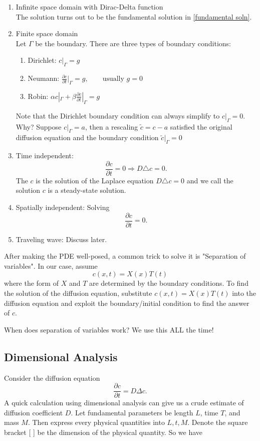 \documentclass[]{article}
\numberwithin{equation}{section}		%
\def\beq{\begin{equation}}
\def\eeq{\end{equation}}
\begin{document}
\begin{enumerate}
\item{Infinite space domain with Dirac-Delta function} \\
The solution turns out to be the fundamental solution in \eqref{fundamental soln}.

\item{Finite space domain } \\
Let $\Gamma$ be the boundary. There are three types of boundary conditions:
	\begin{enumerate}
		\item{Dirichlet:} $c|_{\Gamma}=g$
		\item{Neumann:} $\frac{\partial c}{\partial t}|_{\Gamma}=g,\qquad \text{usually }g=0$
		\item{Robin:} $\alpha c|_{\Gamma}+\beta\frac{\partial c}{\partial t}|_{\Gamma}=g$
	\end{enumerate}
	Note that the Dirichlet boundary condition can always simplify to $c|_{\Gamma}=0$. Why? Suppose $c|_{\Gamma}=a$, then a rescaling $\tilde c=c-a$ satisfied the original diffusion equation and the boundary condition $\tilde c|_{\Gamma}=0$
	
\item{Time independent:}
\beq
	\frac{\partial c}{\partial t}=0\Rightarrow D\triangle c=0.
\eeq
The $c$ is the solution of the Laplace equation $D\triangle c=0$ and we call the solution $c$ is a steady-state solution.
\item{Spatially independent:} Solving
\beq
	\frac{\partial c}{\partial t}=0.
\eeq

\item{Traveling wave:} Discuss later.
\end{enumerate}

After making the PDE well-posed, a common trick to solve it is "Separation of variables". In our case, assume
\beq
	c(x,t)=X(x)T(t)
\eeq
where the form of $X$ and $T$ are determined by the boundary conditions. To find the solution of the diffusion equation, substitute $c(x,t)=X(x)T(t)$ into the diffusion equation and exploit the boundary/initial condition to find the answer of $c$.

When does separation of variables work? We use this ALL the time!
\subsection{Dimensional Analysis}
Consider the diffusion equation
\begin{equation}
  \frac{\partial c}{\partial t}= D \Delta c.
\end{equation}
A quick calculation using dimensional analysis can give us a crude estimate of diffusion coefficient $D$. Let fundamental parameters be length $L$, time $T$, and mass $M$. Then express every physical quantities into $L,t,M$. Denote the square bracket [ ] be the dimension of the physical quantity. So we have
\end{document}
